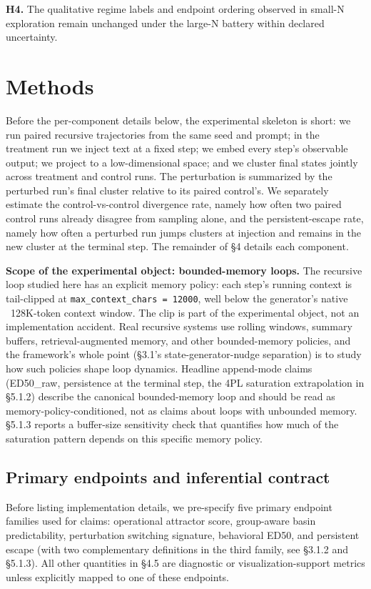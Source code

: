 \documentclass{article}
\theoremstyle{plain}
\theoremstyle{definition}
\begin{document}
\textbf{H4.} The qualitative regime labels and endpoint ordering observed in small-N exploration remain unchanged under the large-N battery within declared uncertainty.

\section{Methods}

Before the per-component details below, the experimental skeleton is short: we run paired recursive trajectories from the same seed and prompt; in the treatment run we inject text at a fixed step; we embed every step's observable output; we project to a low-dimensional space; and we cluster final states jointly across treatment and control runs. The perturbation is summarized by the perturbed run's final cluster relative to its paired control's. We separately estimate the control-vs-control divergence rate, namely how often two paired control runs already disagree from sampling alone, and the persistent-escape rate, namely how often a perturbed run jumps clusters at injection and remains in the new cluster at the terminal step. The remainder of §4 details each component.

\textbf{Scope of the experimental object: bounded-memory loops.} The recursive loop studied here has an explicit memory policy: each step's running context is tail-clipped at \texttt{max\_context\_chars = 12000}, well below the generator's native ~128K-token context window. The clip is part of the experimental object, not an implementation accident. Real recursive systems use rolling windows, summary buffers, retrieval-augmented memory, and other bounded-memory policies, and the framework's whole point (§3.1's state-generator-nudge separation) is to study how such policies shape loop dynamics. Headline append-mode claims (ED50\_raw, persistence at the terminal step, the 4PL saturation extrapolation in §5.1.2) describe the canonical bounded-memory loop and should be read as memory-policy-conditioned, not as claims about loops with unbounded memory. §5.1.3 reports a buffer-size sensitivity check that quantifies how much of the saturation pattern depends on this specific memory policy.

\subsection{Primary endpoints and inferential contract}

Before listing implementation details, we pre-specify five primary endpoint families used for claims: operational attractor score, group-aware basin predictability, perturbation switching signature, behavioral ED50, and persistent escape (with two complementary definitions in the third family, see §3.1.2 and §5.1.3). All other quantities in §4.5 are diagnostic or visualization-support metrics unless explicitly mapped to one of these endpoints.
\end{document}

